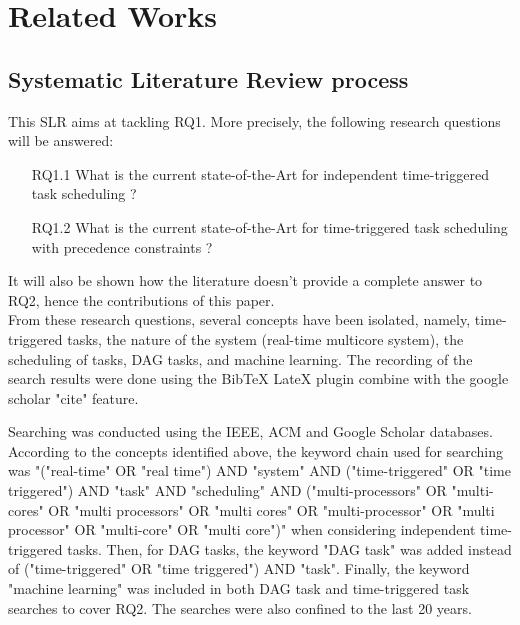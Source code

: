 
\section{Related Works}
\label{sec:literature}

\subsection{Systematic Literature Review process}


This SLR aims at tackling RQ1. More precisely, the following research questions will be answered:

\begin{itemize}
    \item [RQ1.1] What is the current state-of-the-Art for independent time-triggered task scheduling ?
    \item [RQ1.2] What is the current state-of-the-Art for time-triggered task scheduling with precedence constraints ?
\end{itemize}
It will also be shown how the literature doesn't provide 
a complete answer to RQ2, hence the contributions of this paper.\\

From these research questions, several concepts have been isolated,
namely, time-triggered tasks, the nature of the system (real-time multicore system),
the scheduling of tasks, DAG tasks, and machine learning.
The recording of the search results were done using the BibTeX LateX plugin
combine with the google scholar "cite" feature.

Searching was conducted using the IEEE, ACM and Google Scholar databases.
According to the concepts identified above, 
the keyword chain used for searching was 
"("real-time" OR "real time") AND 
"system" AND ("time-triggered" OR "time triggered") AND "task" AND "scheduling" 
AND ("multi-processors" OR "multi-cores" OR "multi processors" OR 
"multi cores" OR "multi-processor" OR "multi processor" OR 
"multi-core" OR "multi core")" when considering independent time-triggered tasks.
Then, for DAG tasks, the keyword "DAG task" was added
instead of ("time-triggered" OR "time triggered") AND "task".
Finally, the keyword "machine learning" was included in 
both DAG task and time-triggered task searches to cover RQ2.
The searches were also confined to the last 20 years.

